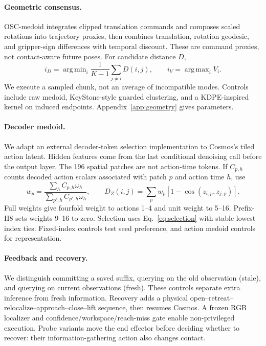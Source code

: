 \documentclass{article}
\DeclareMathOperator*{\argmax}{arg\,max}
\DeclareMathOperator*{\argmin}{arg\,min}
\begin{document}
\paragraph{Geometric consensus.}
OSC-medoid integrates clipped translation commands and composes scaled
rotations into trajectory proxies, then combines translation, rotation
geodesic, and gripper-sign differences with temporal discount. These are
command proxies, not contact-aware future poses. For candidate distance $D$,
\begin{equation}
i_D=\argmin_i\frac1{K-1}\sum_{j\ne i}D(i,j),\qquad
i_V=\argmax_i V_i.
\label{eq:selection}
\end{equation}
We execute a sampled chunk, not an average of incompatible modes. Controls
include raw medoid, KeyStone-style guarded clustering, and a KDPE-inspired
kernel on induced endpoints. Appendix~\ref{app:geometry} gives parameters.

\paragraph{Decoder medoid.}
We adapt an external decoder-token selection implementation
\citep{decoder_code} to Cosmos's tiled action latent. Hidden features come
from the last conditional denoising call before the output layer.
The 196 spatial patches are not action-time tokens. If $C_{p,h}$ counts
decoded action scalars associated with patch $p$ and action time $h$, use
\begin{equation}
w_p=\frac{\sum_hC_{p,h}\omega_h}{\sum_{p',h}C_{p',h}\omega_h},\qquad
D_Z(i,j)=\sum_pw_p[1-\cos(z_{i,p},z_{j,p})].
\label{eq:decoder}
\end{equation}
Full weights give fourfold weight to actions 1--4 and unit weight to 5--16.
Prefix-H8 sets weights 9--16 to zero. Selection uses Eq.~\eqref{eq:selection}
with stable lowest-index ties. Fixed-index controls test seed preference,
and action medoid controls for representation.

\paragraph{Feedback and recovery.}
We distinguish committing a saved suffix, querying on the old observation
(stale), and querying on current observations (fresh). These controls separate
extra inference from fresh information. Recovery adds a physical
open--retreat--relocalize--approach--close--lift sequence, then resumes Cosmos.
A frozen RGB localizer and confidence/workspace/reach-miss gate enable
non-privileged execution. Probe variants move the end effector before deciding
whether to recover: their information-gathering action also changes contact.
\end{document}
